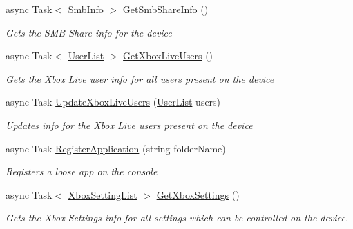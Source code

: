 \begin{DoxyCompactItemize}
async Task$<$ \hyperlink{class_microsoft_1_1_tools_1_1_windows_device_portal_1_1_device_portal_1_1_smb_info}{Smb\+Info} $>$ \hyperlink{class_microsoft_1_1_tools_1_1_windows_device_portal_1_1_device_portal_acbe5fbefd32a3c6897134571551b6196}{Get\+Smb\+Share\+Info} ()
\begin{DoxyCompactList}\small\item\em Gets the S\+MB Share info for the device \end{DoxyCompactList}\item 
async Task$<$ \hyperlink{class_microsoft_1_1_tools_1_1_windows_device_portal_1_1_device_portal_1_1_user_list}{User\+List} $>$ \hyperlink{class_microsoft_1_1_tools_1_1_windows_device_portal_1_1_device_portal_adf73a6b3a1c9df9d2e2ea1e9ea7db8ca}{Get\+Xbox\+Live\+Users} ()
\begin{DoxyCompactList}\small\item\em Gets the Xbox Live user info for all users present on the device \end{DoxyCompactList}\item 
async Task \hyperlink{class_microsoft_1_1_tools_1_1_windows_device_portal_1_1_device_portal_a53b99d1a952392d81099a4e48b581702}{Update\+Xbox\+Live\+Users} (\hyperlink{class_microsoft_1_1_tools_1_1_windows_device_portal_1_1_device_portal_1_1_user_list}{User\+List} users)
\begin{DoxyCompactList}\small\item\em Updates info for the Xbox Live users present on the device \end{DoxyCompactList}\item 
async Task \hyperlink{class_microsoft_1_1_tools_1_1_windows_device_portal_1_1_device_portal_a29ece0e32fbef33ff8649bda7d5a6d38}{Register\+Application} (string folder\+Name)
\begin{DoxyCompactList}\small\item\em Registers a loose app on the console \end{DoxyCompactList}\item 
async Task$<$ \hyperlink{class_microsoft_1_1_tools_1_1_windows_device_portal_1_1_device_portal_1_1_xbox_setting_list}{Xbox\+Setting\+List} $>$ \hyperlink{class_microsoft_1_1_tools_1_1_windows_device_portal_1_1_device_portal_ac66ebdd445993459051752427af65873}{Get\+Xbox\+Settings} ()
\begin{DoxyCompactList}\small\item\em Gets the Xbox Settings info for all settings which can be controlled on the device. \end{DoxyCompactList}\item 

\end{DoxyCompactItemize}
